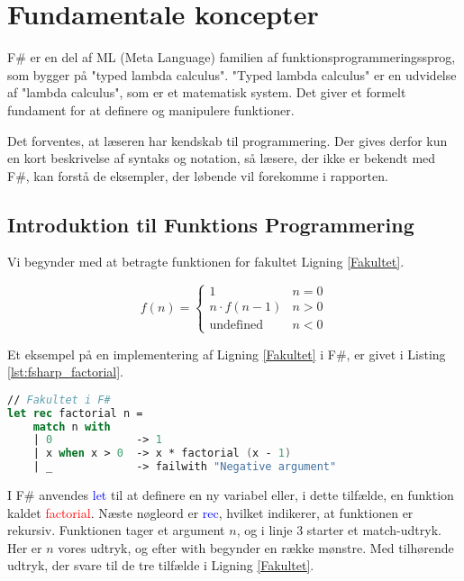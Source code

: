 
\section{Fundamentale koncepter}
F\# er en del af ML (Meta Language) familien af funktionsprogrammeringssprog, som bygger på "typed lambda calculus". "Typed lambda calculus" er en udvidelse af "lambda calculus", som er et matematisk system. Det giver et formelt fundament for at definere og manipulere funktioner.

Det forventes, at læseren har kendskab til programmering. Der gives derfor kun en kort beskrivelse af syntaks og notation, så læsere, der ikke er bekendt med F\#, kan forstå de eksempler, der løbende vil forekomme i rapporten. 

\subsection{Introduktion til Funktions Programmering}
Vi begynder med at betragte funktionen for fakultet Ligning \eqref{Fakultet}.

\begin{equation}
    \label{Fakultet}
    f(n) = \begin{cases} 
            1 &  n = 0  \\
            n \cdot f(n-1) & n > 0 \\
            \text{undefined} & n < 0 
           \end{cases}
\end{equation}

Et eksempel på en implementering af Ligning \eqref{Fakultet} i F\#, er givet i Listing \ref{lst:fsharp_factorial}.

\begin{lstlisting}[language={FSharp}, label={lst:fsharp_factorial}, caption={Eksempel på Fakultet i F\#}]
// Fakultet i F#
let rec factorial n =
    match n with
    | 0             -> 1 
    | x when x > 0  -> x * factorial (x - 1)
    | _             -> failwith "Negative argument"
\end{lstlisting}

I F\# anvendes \textcolor{blue}{let} til at definere en ny variabel eller, i dette tilfælde, en funktion kaldet \textcolor{red}{factorial}. Næste nøgleord er \textcolor{blue}{rec}, hvilket indikerer, at funktionen er rekursiv. Funktionen tager et argument \(n\), og i linje 3 starter et match-udtryk. Her er \(n\) vores udtryk, og efter \textcolor{codepurple}{with} begynder en række mønstre. Med tilhørende udtryk, der svare til de tre tilfælde i Ligning \eqref{Fakultet}. 
    
